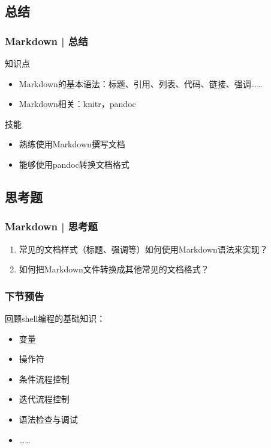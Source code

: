 \subsection{总结}
\begin{frame}
  \frametitle{Markdown | 总结}
  \begin{block}{知识点}
    \begin{itemize}
      \item Markdown的基本语法：标题、引用、列表、代码、链接、强调……
      \item Markdown相关：knitr，pandoc
    \end{itemize}
  \end{block}
  \begin{block}{技能}
    \begin{itemize}
      \item 熟练使用Markdown撰写文档
      \item 能够使用pandoc转换文档格式
    \end{itemize}
  \end{block}
\end{frame}

\subsection{思考题}
\begin{frame}
  \frametitle{Markdown | 思考题}
  \begin{enumerate}
    \item 常见的文档样式（标题、强调等）如何使用Markdown语法来实现？
    \item 如何把Markdown文件转换成其他常见的文档格式？
  \end{enumerate}
\end{frame}

\begin{frame}
  \frametitle{下节预告}
  回顾shell编程的基础知识：
  \begin{itemize}
    \item 变量
    \item 操作符
    \item 条件流程控制
    \item 迭代流程控制
    \item 语法检查与调试
    \item ……
  \end{itemize}
\end{frame}



